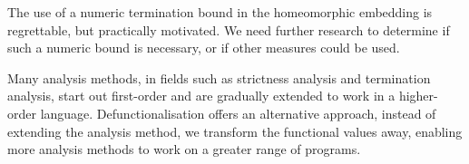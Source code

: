 \documentclass[preprint]{sigplanconf}
\begin{document}
The use of a numeric termination bound in the homeomorphic embedding is regrettable, but practically motivated. We need further research to determine if such a numeric bound is necessary, or if other measures could be used.

Many analysis methods, in fields such as strictness analysis and termination analysis, start out first-order and are gradually extended to work in a higher-order language. Defunctionalisation offers an alternative approach, instead of extending the analysis method, we transform the functional values away, enabling more analysis methods to work on a greater range of programs.




\end{document}
